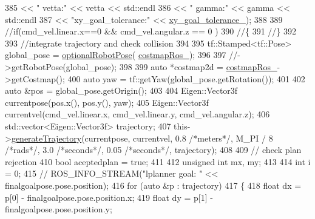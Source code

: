 \begin{DoxyCode}
{385                                               << \textcolor{stringliteral}{" vetta:"} << vetta << std::endl
386                                               << \textcolor{stringliteral}{" gamma:"} << gamma << std::endl
387                                               << \textcolor{stringliteral}{"xy\_goal\_tolerance:"} << 
      \hyperlink{classmove__base__z__client_1_1forward__local__planner_1_1ForwardLocalPlanner_a462f6c9011e538965326add2dfb7529d}{xy\_goal\_tolerance\_});
388 
389     \textcolor{comment}{//if(cmd\_vel.linear.x==0 && cmd\_vel.angular.z == 0 )}
390     \textcolor{comment}{//\{}
391     \textcolor{comment}{//\}}
392 
393     \textcolor{comment}{//integrate trajectory and check collision}
394 
395     tf::Stamped<tf::Pose> global\_pose = \hyperlink{namespacemove__base__z__client_1_1forward__local__planner_a683a39a154ed5aa179fdb1afb7bfe2e4}{optionalRobotPose}(
      \hyperlink{classmove__base__z__client_1_1forward__local__planner_1_1ForwardLocalPlanner_a00139db9509e49ff456276a86785d234}{costmapRos\_});
396     
397     \textcolor{comment}{//->getRobotPose(global\_pose);}
398 
399     \textcolor{keyword}{auto} *costmap2d = \hyperlink{classmove__base__z__client_1_1forward__local__planner_1_1ForwardLocalPlanner_a00139db9509e49ff456276a86785d234}{costmapRos\_}->getCostmap();
400     \textcolor{keyword}{auto} yaw = tf::getYaw(global\_pose.getRotation());
401 
402     \textcolor{keyword}{auto} &pos = global\_pose.getOrigin();
403 
404     Eigen::Vector3f currentpose(pos.x(), pos.y(), yaw);
405     Eigen::Vector3f currentvel(cmd\_vel.linear.x, cmd\_vel.linear.y, cmd\_vel.angular.z);
406     std::vector<Eigen::Vector3f> trajectory;
407     this->\hyperlink{classmove__base__z__client_1_1forward__local__planner_1_1ForwardLocalPlanner_af0f99683368650fd03c04079afd8c806}{generateTrajectory}(currentpose, currentvel, 0.8 \textcolor{comment}{/*meters*/}, M\_PI / 8 \textcolor{comment}{/*rads*/}, 
      3.0 \textcolor{comment}{/*seconds*/}, 0.05 \textcolor{comment}{/*seconds*/}, trajectory);
408 
409     \textcolor{comment}{// check plan rejection}
410     \textcolor{keywordtype}{bool} aceptedplan = \textcolor{keyword}{true};
411 
412     \textcolor{keywordtype}{unsigned} \textcolor{keywordtype}{int} mx, my;
413 
414     \textcolor{keywordtype}{int} i = 0;
415     \textcolor{comment}{// ROS\_INFO\_STREAM("lplanner goal: " << finalgoalpose.pose.position);}
416     \textcolor{keywordflow}{for} (\textcolor{keyword}{auto} &p : trajectory)
417     \{
418         \textcolor{keywordtype}{float} dx = p[0] - finalgoalpose.pose.position.x;
419         \textcolor{keywordtype}{float} dy = p[1] - finalgoalpose.pose.position.y;
}
\end{DoxyCode}
